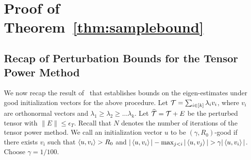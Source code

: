 %

\section{Proof of Theorem~\ref{thm:samplebound}}\label{app:samplebound}

\subsection{Recap of Perturbation Bounds for the Tensor Power Method}

We now recap the result of~\citet[Thm. 13]{AnandkumarEtal:community12} that establishes bounds on the eigen-estimates under good initialization vectors for the above procedure.
Let ${\mathcal{T}}=\sum_{i\in [k]}\lambda_i v_i$, where $v_i$ are orthonormal vectors and $\lambda_1\geq \lambda_2\geq\ldots \lambda_k$. Let $\widehat{{\mathcal{T}}}={\mathcal{T}}+E$ be the perturbed tensor with $\|E\|\leq \epsilon_{T}$. Recall that $N$ denotes the number of iterations of the tensor power method.
We call an initialization vector $u$ to be $(\gamma, R_0)$-good  if there exists $v_i$ such that $\left\langle u,v_i \right\rangle> R_0$
  and $|\left\langle u,v_i \right\rangle| -\max_{j<i} |\left\langle u,v_j \right\rangle| > \gamma  |\left\langle u,v_i \right\rangle|$.   Choose $\gamma=1/100$.


